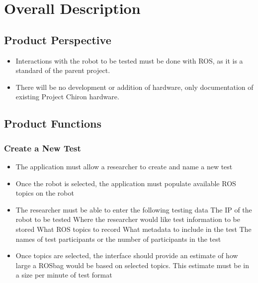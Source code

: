 \documentclass[onecolumn, draftclsnofoot,10pt, compsoc]{report}
\begin{document}
	
	\section{Overall Description}
	\subsection{Product Perspective}
	\begin{itemize}
		\item Interactions with the robot to be tested must be done with ROS, as it is a standard of the parent project.
		\item There will be no development or addition of hardware, only documentation of existing Project Chiron hardware.
	\end{itemize}
	\subsection{Product Functions}
	\subsubsection{Create a New Test}
	\begin{itemize}
		\item The application must allow a researcher to create and name a new test
		\item Once the robot is selected, the application must populate available ROS topics on the robot
		\item The researcher must be able to enter the following testing data
		\subitem The IP of the robot to be tested
		\subitem Where the researcher would like test information to be stored
		\subitem What ROS topics to record
		\subitem What metadata to include in the test
		\subitem The names of test participants or the number of participants in the test
		\item Once topics are selected, the interface should provide an estimate of how large a ROSbag would be based on selected topics. This estimate must be in a size per minute of test format
	\end{itemize}
\end{document}
